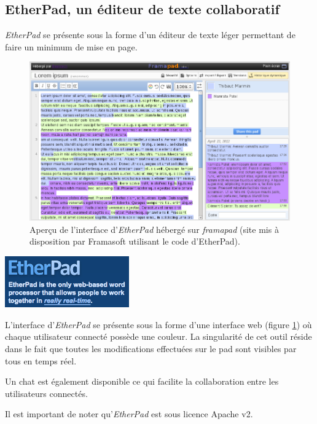 \subsection{EtherPad, un éditeur de texte collaboratif}
\emph{EtherPad} se présente sous la forme d'un éditeur de texte léger permettant de faire un minimum de mise en page.

\begin{figure}[H]
	\includegraphics[width=\textwidth]{files/outils/etherpad_screenshot}	
	\caption{Aperçu de l'interface d'\emph{EtherPad} hébergé sur \emph{framapad} (site mis à disposition par Framasoft utilisant le code d'EtherPad).}
	\label{etherpad_screenshot}
\end{figure}

\begin{center}
\includegraphics[width=0.4\textwidth]{files/outils/etherpad}
\end{center}

L'interface d'\emph{EtherPad} se présente sous la forme d'une interface web (figure \ref{etherpad_screenshot}) où chaque utilisateur connecté possède une couleur. La singularité de cet outil réside dans le fait que toutes les modifications effectuées sur le pad sont visibles par tous en temps réel.

Un chat est également disponible ce qui facilite la collaboration entre les utilisateurs connectés.

Il est important de noter qu'\emph{EtherPad} est sous licence \gls{Apache v2}.

